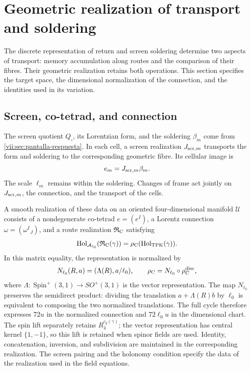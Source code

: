 
\section{Geometric realization of transport and soldering}
\label{vii:sec:realizacion-cartan}

The discrete representation of return and screen soldering determine
two aspects of transport: memory accumulation along routes and the
comparison of their fibres. Their geometric realization retains both
operations. This section specifies the target space, the dimensional
normalization of the connection, and the identities used in its variation.

\subsection{Screen, co-tetrad, and connection}

The screen quotient \(Q_\square\), its Lorentzian form, and the
soldering \(\beta_m\) come from
\ref{vii:sec:pantalla-respuesta}. In each cell, a screen realization
\(J_{{\rm scr},m}\) transports the form and soldering to the
corresponding geometric fibre. Its cellular image is
\[
 e_m=J_{{\rm scr},m}\beta_m.
\]
The scale \(\ell_m\) remains within the soldering. Changes of
frame act jointly on \(J_{{\rm scr},m}\), the connection, and
the transport of the cells.

A smooth realization of these data on an oriented four-dimensional
manifold \(\mathcal U\) consists of a nondegenerate co-tetrad
\(e=(e^I)\), a Lorentz connection
\(\omega=(\omega^I{}_J)\), and a route realization
\(\mathfrak R_{\rm C}\) satisfying
\begin{equation}
 \operatorname{Hol}_{\mathcal A_{\ell_0}}
       (\mathfrak R_{\rm C}(\gamma))
 =\rho_{\rm C}(\operatorname{Hol}_{\rm TPK}(\gamma)).
 \label{vii:eq:compatibilidad-holonomia-geometrica}
\end{equation}
In this matrix equality, the representation is normalized by
\[
 N_{\ell_0}(R,a)=(\Lambda(R),a/\ell_0),\qquad
 \rho_{\rm C}=N_{\ell_0}\circ\rho_{\rm C}^{\rm disc},
\]
where \(\Lambda:\operatorname{Spin}^+(3,1)\to SO^+(3,1)\)
is the vector representation. The map \(N_{\ell_0}\) preserves
the semidirect product: dividing the translation
\(a+\Lambda(R)b\) by \(\ell_0\) is equivalent to composing
the two normalized translations. The full cycle therefore expresses
\(72u\) in the normalized connection and \(72\ell_0u\) in
the dimensional chart. The spin lift separately retains
\(R_4^{c_g(\gamma)}\); the vector representation has central
kernel \(\{1,-1\}\), so this lift is retained when spinor
fields are used.
Identity, concatenation, inversion, and subdivision are maintained in
the corresponding realization. The screen pairing and the holonomy
condition specify the data of the realization used in the field equations.

